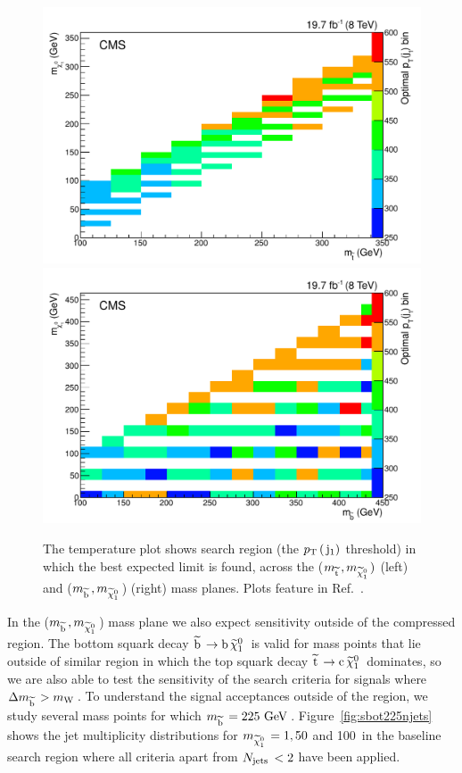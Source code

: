 \begin{figure}[!Hhtb]
  \begin{center}
  \includegraphics[scale=0.39]{Figures/sus13009/limitplots/optimal_stop_jet1pT.pdf}
  \includegraphics[scale=0.39]{Figures/sus13009/limitplots/optimal_sbottom_jet1pT.pdf}
  \caption{The temperature plot shows search region (the $p_{\text{T}}\,(\,\mathrm{j}_1)$ threshold) in which the best expected limit is found, across the ($m_{\widetilde{{\rm t}}\,}, m_{\widetilde{\chi}^{0}_{1}\,})$ (left) and ($m_{\widetilde{{\rm b}}\,},m_{\widetilde{\chi}^{0}_{1}\,}$) (right) mass planes. Plots feature in Ref.~\cite{sus14001}.}
  \label{fig:optimalJ1}
  \end{center}
\end{figure}

In the ($m_{\widetilde{{\rm b}}\,}, m_{\widetilde{\chi}^{0}_{1}\,}$) mass plane we also expect sensitivity outside of the compressed region. 
The bottom squark decay $\widetilde{{\rm b}}\, \rightarrow {\rm b}\, \widetilde{\chi}^{0}_{1}\,$ is valid for mass points that lie outside of similar region in which the top squark decay $\widetilde{{\rm t}}\, \rightarrow {\rm c}\, \widetilde{\chi}^{0}_{1}\,$ dominates, so we are also able to test the sensitivity of the search criteria for signals where $\Delta m_{\widetilde{{\rm b}}\,}>m_{\mathrm{W}\,}$.
To understand the signal acceptances outside of the region, we study several mass points for which $m_{\widetilde{{\rm b}}\,}=225~\mathrm{GeV}\,$. 
Figure~\ref{fig:sbot225njets} shows the jet multiplicity distributions for $m_{\widetilde{\chi}^{0}_{1}\,}=1,50$ and 100~\GeV in the baseline search region where all criteria apart from $N_{\text{jets}}\,<2$ have been applied.  

